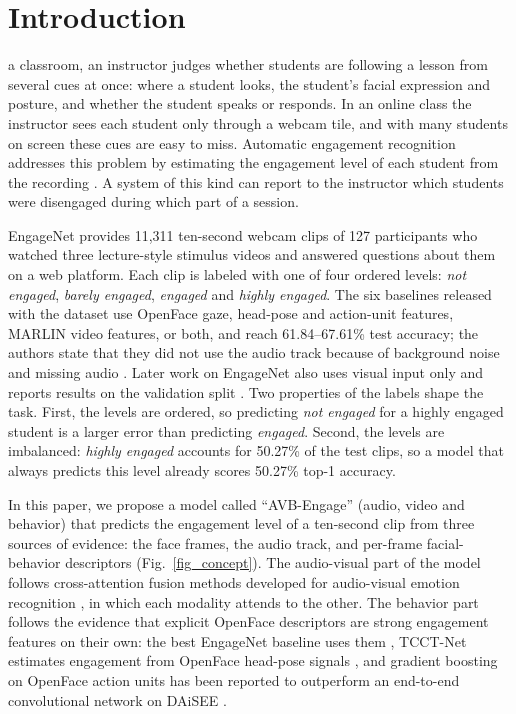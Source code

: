 \documentclass[journal]{IEEEtran}
\newcommand{\ournet}{AVB-Engage}
\begin{document}
\IEEEpeerreviewmaketitle

\section{Introduction}

 a classroom, an instructor judges whether students are following a lesson from several cues at once: where a student looks, the student's facial expression and posture, and whether the student speaks or responds. In an online class the instructor sees each student only through a webcam tile, and with many students on screen these cues are easy to miss. Automatic engagement recognition addresses this problem by estimating the engagement level of each student from the recording \cite{qarbal2025review}. A system of this kind can report to the instructor which students were disengaged during which part of a session.

EngageNet \cite{singh2023engagenet} provides 11,311 ten-second webcam clips of 127 participants who watched three lecture-style stimulus videos and answered questions about them on a web platform. Each clip is labeled with one of four ordered levels: \emph{not engaged}, \emph{barely engaged}, \emph{engaged} and \emph{highly engaged}. The six baselines released with the dataset use OpenFace gaze, head-pose and action-unit features, MARLIN video features, or both, and reach 61.84--67.61\% test accuracy; the authors state that they did not use the audio track because of background noise and missing audio \cite{singh2023engagenet}. Later work on EngageNet also uses visual input only and reports results on the validation split \cite{vedernikov2024tcct,abedi2024stgcn,vedernikov2026priornet,augusma2026vemd}. Two properties of the labels shape the task. First, the levels are ordered, so predicting \emph{not engaged} for a highly engaged student is a larger error than predicting \emph{engaged}. Second, the levels are imbalanced: \emph{highly engaged} accounts for 50.27\% of the test clips, so a model that always predicts this level already scores 50.27\% top-1 accuracy.

In this paper, we propose a model called ``\ournet'' (audio, video and behavior) that predicts the engagement level of a ten-second clip from three sources of evidence: the face frames, the audio track, and per-frame facial-behavior descriptors (Fig.~\ref{fig_concept}). The audio-visual part of the model follows cross-attention fusion methods developed for audio-visual emotion recognition \cite{venkatraman2025avtca}, in which each modality attends to the other. The behavior part follows the evidence that explicit OpenFace descriptors are strong engagement features on their own: the best EngageNet baseline uses them \cite{singh2023engagenet}, TCCT-Net estimates engagement from OpenFace head-pose signals \cite{vedernikov2024tcct}, and gradient boosting on OpenFace action units has been reported to outperform an end-to-end convolutional network on DAiSEE \cite{das2025optimizing}.
\end{document}
